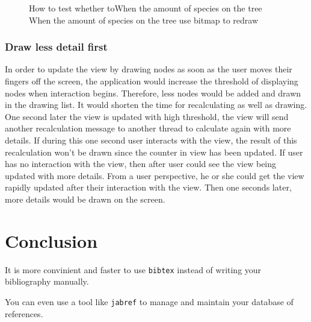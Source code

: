 \documentclass[MSc]{icldt}
\begin{document}
\begin{figure}[H]
\caption{How to test whether toWhen the amount of species on the tree When the amount of species on the tree  use bitmap to redraw}
\end{figure}


\subsection{Draw less detail first}

In order to update the view by drawing nodes as soon as the user moves their fingers off the screen, the application would increase the threshold of displaying nodes when interaction begins. Therefore, less nodes would be added and drawn in the drawing list. It would shorten the time for recalculating as well as drawing. One second later the view is updated with high threshold, the view will send another recalculation message to another thread to calculate again with more details. If during this one second user interacts with the view, the result of this recalculation won't be drawn since the counter in view has been updated. If user has no interaction with the view, then after user could see the view being updated with more details. From a user perspective, he or she could get the view rapidly updated after their interaction with the view. Then one seconds later, more details would be drawn on the screen.


\chapter{Conclusion}


\begin{thebibliography}{123}
\raggedright

 It is more convinient and faster to use \texttt{bibtex} instead 
of writing your bibliography manually.

You can even use a tool like \texttt{jabref} to manage and maintain your 
database of references.

\end{thebibliography}
\end{document}
